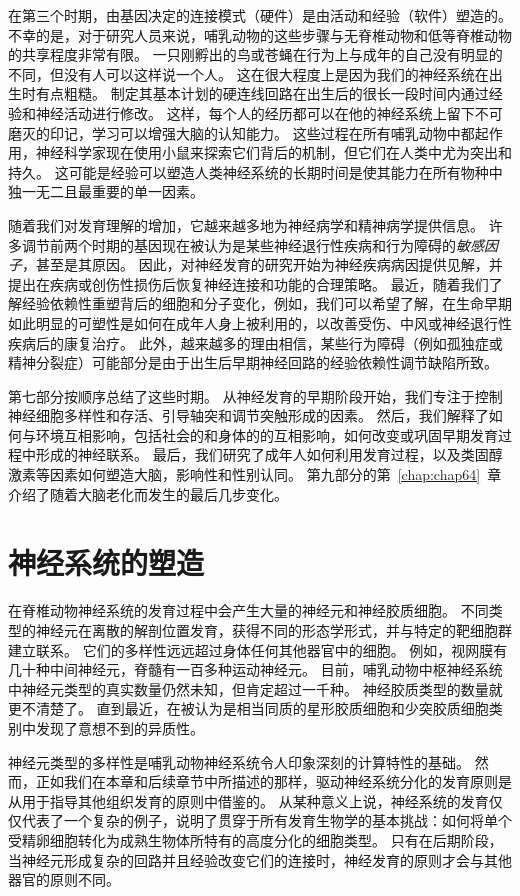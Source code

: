 在第三个时期，由基因决定的连接模式（硬件）是由活动和经验（软件）塑造的。
不幸的是，对于研究人员来说，哺乳动物的这些步骤与无脊椎动物和低等脊椎动物的共享程度非常有限。
一只刚孵出的鸟或苍蝇在行为上与成年的自己没有明显的不同，但没有人可以这样说一个人。
这在很大程度上是因为我们的神经系统在出生时有点粗糙。
制定其基本计划的硬连线回路在出生后的很长一段时间内通过经验和神经活动进行修改。
这样，每个人的经历都可以在他的神经系统上留下不可磨灭的印记，学习可以增强大脑的认知能力。
这些过程在所有哺乳动物中都起作用，神经科学家现在使用小鼠来探索它们背后的机制，但它们在人类中尤为突出和持久。
这可能是经验可以塑造人类神经系统的长期时间是使其能力在所有物种中独一无二且最重要的单一因素。


随着我们对发育理解的增加，它越来越多地为神经病学和精神病学提供信息。
许多调节前两个时期的基因现在被认为是某些神经退行性疾病和行为障碍的\textit{敏感因子}，甚至是其原因。
因此，对神经发育的研究开始为神经疾病病因提供见解，并提出在疾病或创伤性损伤后恢复神经连接和功能的合理策略。
最近，随着我们了解经验依赖性重塑背后的细胞和分子变化，例如，我们可以希望了解，在生命早期如此明显的可塑性是如何在成年人身上被利用的，以改善受伤、中风或神经退行性疾病后的康复治疗。
此外，越来越多的理由相信，某些行为障碍（例如孤独症或精神分裂症）可能部分是由于出生后早期神经回路的经验依赖性调节缺陷所致。


第七部分按顺序总结了这些时期。
从神经发育的早期阶段开始，我们专注于控制神经细胞多样性和存活、引导轴突和调节突触形成的因素。
然后，我们解释了如何与环境互相影响，包括社会的和身体的的互相影响，如何改变或巩固早期发育过程中形成的神经联系。
最后，我们研究了成年人如何利用发育过程，以及类固醇激素等因素如何塑造大脑，影响性和性别认同。
第九部分的第~\ref{chap:chap64}~章介绍了随着大脑老化而发生的最后几步变化。



\chapter{神经系统的塑造} \label{chap:chap45}

在脊椎动物神经系统的发育过程中会产生大量的神经元和神经胶质细胞。
不同类型的神经元在离散的解剖位置发育，获得不同的形态学形式，并与特定的靶细胞群建立联系。
它们的多样性远远超过身体任何其他器官中的细胞。
例如，视网膜有几十种中间神经元，脊髓有一百多种运动神经元。
目前，哺乳动物中枢神经系统中神经元类型的真实数量仍然未知，但肯定超过一千种。
神经胶质类型的数量就更不清楚了。
直到最近，在被认为是相当同质的星形胶质细胞和少突胶质细胞类别中发现了意想不到的异质性。


神经元类型的多样性是哺乳动物神经系统令人印象深刻的计算特性的基础。
然而，正如我们在本章和后续章节中所描述的那样，驱动神经系统分化的发育原则是从用于指导其他组织发育的原则中借鉴的。
从某种意义上说，神经系统的发育仅仅代表了一个复杂的例子，说明了贯穿于所有发育生物学的基本挑战：如何将单个受精卵细胞转化为成熟生物体所特有的高度分化的细胞类型。
只有在后期阶段，当神经元形成复杂的回路并且经验改变它们的连接时，神经发育的原则才会与其他器官的原则不同。


